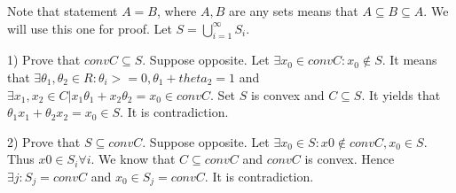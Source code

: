 Note that statement $A = B$, where $A, B$ are any sets means that $A \subseteq B \subseteq A$. We will use this one for proof. Let $S = \bigcup _{i=1}^{\infty} S_{i}$.

1) Prove that $conv C \subseteq S$. Suppose opposite. Let $\exists x_{0} \in conv C : x_{0} \notin S$.
It means that $\exists \theta_1, \theta_2 \in R : \theta_i >= 0, \theta_1 + theta_2 = 1$ and $\exists x_1, x_2 \in C | x_1 \theta_1 + x_2 \theta_2 = x_0 \in conv C$. Set $S$ is convex and $C \subseteq S$. It yields that $\theta_1 x_1 + \theta_2 x_2 = x_0 \in S$. It is contradiction.

2) Prove that $S \subseteq conv C$. Suppose opposite. Let $\exists x_0 \in S : x0 \notin conv C, x_0 \in S$. Thus $x0 \in S_i \forall i$. We know that $C \subseteq conv C$ and $conv C$ is convex. Hence $\exists j : S_j = conv C$ and $x_0 \in S_j = conv C$. It is contradiction.

